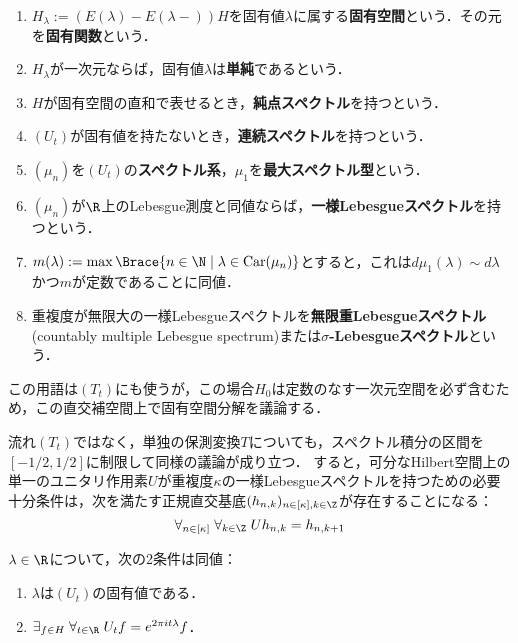 \documentclass[uplatex,dvipdfmx]{jsreport}
\newcommand{\Car}{\mathrm{Car}}
\begin{document}
\begin{definition}\mbox{}
    \begin{enumerate}
        \item $H_\lambda:=(E(\lambda)-E(\lambda-))H$を固有値$\lambda$に属する\textbf{固有空間}という．その元を\textbf{固有関数}という．
        \item $H_\lambda$が一次元ならば，固有値$\lambda$は\textbf{単純}であるという．
        \item $H$が固有空間の直和で表せるとき，\textbf{純点スペクトル}を持つという．
        \item $(U_t)$が固有値を持たないとき，\textbf{連続スペクトル}を持つという．
        \item $(\mu_n)$を$(U_t)$の\textbf{スペクトル系}，$\mu_1$を\textbf{最大スペクトル型}という．
        \item $(\mu_n)$が$\R$上のLebesgue測度と同値ならば，\textbf{一様Lebesgueスペクトル}を持つという．
        \item $m(\lambda):=\max\Brace{n\in\N\mid\lambda\in\Car(\mu_n)}$とすると，これは$d\mu_1(\lambda)\sim d\lambda$かつ$m$が定数であることに同値．
        \item 重複度が無限大の一様Lebesgueスペクトルを\textbf{無限重Lebesgueスペクトル}(countably multiple Lebesgue spectrum)または\textbf{$\sigma$-Lebesgueスペクトル}という．
    \end{enumerate}
    この用語は$(T_t)$にも使うが，この場合$H_0$は定数のなす一次元空間を必ず含むため，この直交補空間上で固有空間分解を議論する．
\end{definition}
\begin{remark}
    流れ$(T_t)$ではなく，単独の保測変換$T$についても，スペクトル積分の区間を$[-1/2,1/2]$に制限して同様の議論が成り立つ．
    すると，可分なHilbert空間上の単一のユニタリ作用素$U$が重複度$\kappa$の一様Lebesgueスペクトルを持つための必要十分条件は，次を満たす正規直交基底$(h_{n,k})_{n\in[\kappa],k\in\Z}$が存在することになる：
    \[\forall_{n\in[\kappa]}\;\forall_{k\in\Z}\;Uh_{n,k}=h_{n,k+1}\]
\end{remark}

\begin{proposition}
    $\lambda\in\R$について，次の2条件は同値：
    \begin{enumerate}
        \item $\lambda$は$(U_t)$の固有値である．
        \item $\exists_{f\in H}\;\forall_{t\in\R}\;U_tf=e^{2\pi it\lambda}f$．
    \end{enumerate}
\end{proposition}
\end{document}
